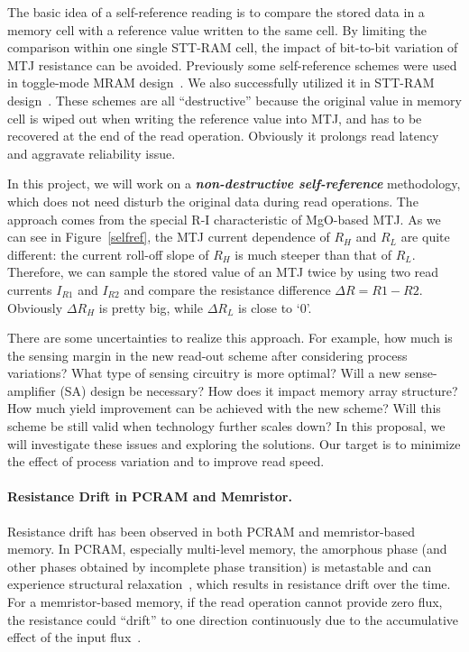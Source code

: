The basic idea of a self-reference reading is to compare the stored data in a memory cell with a reference value written to the same cell. By limiting the comparison within one single STT-RAM cell, the impact of bit-to-bit variation of MTJ resistance can be avoided. Previously some self-reference schemes were used in toggle-mode MRAM design~\cite{MRAM:TTO+06,Jeong03}. We also successfully utilized it in STT-RAM design~\cite{Li:147723}. These schemes are all ``destructive'' because the original value in memory cell is wiped out when writing the reference value into MTJ, and has to be recovered at the end of the read operation. Obviously it prolongs read latency and aggravate reliability issue.

In this project, we will work on a \textbf{\textit{non-destructive self-reference}} methodology, which does not need disturb the original data during read operations. The approach comes from the special R-I characteristic of MgO-based MTJ. As we can see in Figure~\ref{selfref}, the MTJ current dependence of $R_H$ and $R_L$ are quite different: the current roll-off slope of $R_H$ is much steeper than that of $R_L$. Therefore, we can sample the stored value of an MTJ twice by using two read currents $I_{R1}$ and $I_{R2}$ and compare the resistance difference ${\Delta}R=R1-R2$. Obviously ${\Delta}R_H$ is pretty big, while ${\Delta}R_L$ is close to `0'.

There are some uncertainties to realize this approach. For example, how much is the sensing margin in the new read-out scheme after considering process variations? What type of sensing circuitry is more optimal? Will a new sense-amplifier (SA) design be necessary? How does it impact memory array structure? How much yield improvement can be achieved with the new scheme? Will this scheme be still valid when technology further scales down? In this proposal, we will investigate these issues and exploring the solutions. Our target is to minimize the effect of process variation and to improve read speed.

\paragraph{Resistance Drift in PCRAM and Memristor.} Resistance drift has been observed in both PCRAM and memristor-based memory. In PCRAM, especially multi-level memory, the amorphous phase (and other phases obtained by incomplete phase transition) is metastable and can experience structural relaxation~\cite{Pirovano04}, which results in resistance drift over the time. For a memristor-based memory, if the read operation cannot provide zero flux, the resistance could ``drift'' to one direction continuously due to the accumulative effect of the input flux~\cite{Ho09}.

